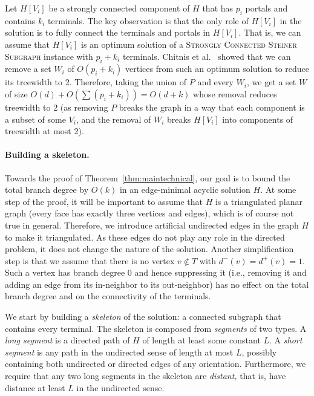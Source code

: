 \documentclass[a4paper,11pt]{article}
\theoremstyle{plain}
\newtheorem{identification rule}{Identification Rule}
\theoremstyle{definition}
\theoremstyle{remark}
\begin{document}
  Let $H[V_i]$ be a strongly connected component of $H$ that has $p_i$ portals and contains $k_i$ terminals. The key observation is that the only role of $H[V_i]$ in the solution is to fully connect the terminals and portals in $H[V_i]$. That is, we can assume that $H[V_i]$ is an optimum solution of a \textsc{Strongly Connected Steiner Subgraph} instance with $p_i+k_i$ terminals. Chitnis et al.~\cite{ChitnisFHM20} showed that we can remove a set $W_i$ of $O(p_i+k_i)$ vertices from such an optimum solution to reduce its treewidth to 2. Therefore, taking the union of $P$ and every $W_i$, we get a set $W$ of size $O(d)+O(\sum (p_i+k_i))=O(d+k)$ whose removal reduces treewidth to 2 (as removing $P$ breaks the graph in a way that each component is a subset of some $V_i$, and the removal of $W_i$ breaks $H[V_i]$ into components of treewidth at most 2).

  \paragraph{Building a skeleton.} Towards the proof of Theorem~\ref{thm:maintechnical}, our goal is to bound the total branch degree by $O(k)$ in an edge-minimal acyclic solution $H$. At some step of the proof, it will be important to assume that $H$ is a triangulated planar graph (every face has exactly three vertices and edges), which is of course not true in general. Therefore, we introduce artificial undirected edges in the graph $H$ to make it triangulated. As these edges do not play any role in the directed problem, it does not change the nature of the solution. Another simplification step is that we assume that there is no vertex $v\not\in T$ with $d^-(v)=d^+(v)=1$. Such a vertex has branch degree 0 and hence suppressing it (i.e., removing it and adding an edge from its in-neighbor to its out-neighbor) has no effect on the total branch degree and on the connectivity of the terminals.

  We start by building a \emph{skeleton} of the solution: a connected subgraph that contains every terminal. The skeleton is composed from {\em segments} of two types. A {\em long segment} is a directed path of $H$ of length at least some constant $L$. A {\em short segment} is any path in the undirected sense of length at most $L$, possibly containing both undirected or directed edges of any orientation. Furthermore, we require that any two long segments in the skeleton are {\em distant,} that is, have distance at least $L$ in the undirected sense.
\end{document}
